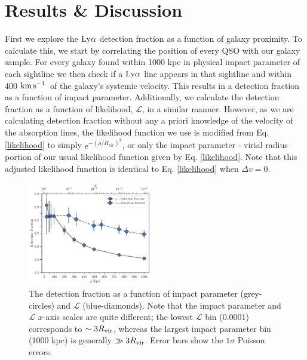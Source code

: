 \documentclass[twocolumn,tighten]{aastex62}
\newcommand{\kms}{$\rm km\, s^{-1}$}
\begin{document}




\section{Results \& Discussion}

First we explore the $\rm Ly\alpha$ detection fraction as a function of galaxy proximity. To calculate this, we start by correlating the position of every QSO with our galaxy sample. For every galaxy found within 1000 kpc in physical impact parameter of each sightline we then check if a $\rm Ly\alpha$ line appears in that sightline and within 400 \kms~of the galaxy's systemic velocity. This results in a detection fraction as a function of impact parameter. Additionally, we calculate the detection fraction as a function of likelihood, $\mathcal{L}$, in a similar manner. However, as we are calculating detection fraction without any a priori knowledge of the velocity of the absorption lines, the likelihood function we use is modified from Eq. \ref{likelihood} to simply $e^{-(\rho/R_{vir})^2}$, or only the impact parameter - virial radius portion of our usual likelihood function given by Eq. \ref{likelihood}. Note that this adjusted likelihood function is identical to Eq. \ref{likelihood} when $\Delta v = 0$. 

\begin{figure}[t!]
        \centering
        \vspace{0pt}
        \includegraphics[width=0.49\textwidth]{detection_fraction_both_err.pdf}
        \caption{\small{The detection fraction as a function of impact parameter (grey-circles) and $\mathcal{L}$ (blue-diamonds). Note that the impact parameter and $\mathcal{L}$ $x$-axis scales are quite different; the lowest $\mathcal{L}$ bin (0.0001) corresponds to $\sim 3 R_{\rm vir}$, whereas the largest impact parameter bin (1000 kpc) is generally $\gg 3 R_{\rm vir}$. Error bars show the $1\sigma$ Poisson errors.}}
        \vspace{5pt}
        \label{detection_fraction}
\end{figure}
\end{document}
